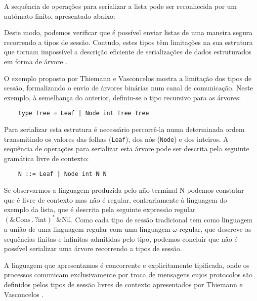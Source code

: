 A sequência de operações para serializar a lista pode ser reconhecida por um autómato finito, apresentado abaixo:



Deste modo, podemos verificar que é possível enviar listas de uma maneira segura recorrendo a tipos de sessão. Contudo, estes tipos têm limitações na sua estrutura que tornam impossível a descrição eficiente de serializações de dados estruturados em forma de árvore \cite{ref-cfst}.

O exemplo proposto por Thiemann e Vasconcelos \cite{ref-cfst}
mostra a limitação dos tipos de sessão, formalizando o envio de árvores binárias num canal de comunicação. Neste exemplo, à semelhança do anterior, definiu-se o tipo recursivo para as árvores:
\begin{lstlisting}
	type Tree = Leaf | Node int Tree Tree
\end{lstlisting}
Para serializar esta estrutura é necessário percorrê-la numa determinada ordem transmitindo os valores das folhas (\lstinline"Leaf"), dos nós (\lstinline"Node") e dos inteiros. A sequência de operações para serializar esta árvore pode ser descrita pela seguinte gramática livre de contexto:
\begin{lstlisting}
	N ::= Leaf | Node int N N
\end{lstlisting}
Se observarmos a linguagem produzida pelo não terminal N podemos constatar que é livre de contexto mas não é regular, contrariamente à linguagem do exemplo da lista, que é descrita pela seguinte expressão regular $(\&\mbox{Cons}\,.\,?\mbox{int})^{*}\,\&\mbox{Nil}$. Como cada tipo de sessão tradicional tem como linguagem a união de uma linguagem regular com uma linguagem $\omega$-regular, que descreve as sequências finitas e infinitas admitidas pelo tipo, podemos concluir que não é possível serializar uma árvore recorrendo a tipos de sessão.

A linguagem que apresentamos é concorrente e explicitamente tipificada, onde os processos comunicam exclusivamente por troca de mensagens cujos protocolos são definidos pelos tipos de sessão livres de contexto apresentados por Thiemann e Vasconcelos \cite{ref-cfst}.


